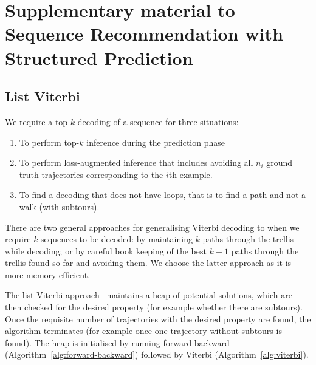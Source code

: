 \appendix
\section{Supplementary material to Sequence Recommendation with Structured Prediction}
\label{sec:supplement}

\subsection{List Viterbi}
\label{sec:listviterbi-supp}

We require a top-$k$ decoding of a sequence for three situations:
\begin{enumerate}
  \item To perform top-$k$ inference during the prediction phase
  \item To perform loss-augmented inference that includes avoiding all $n_i$ ground truth
    trajectories corresponding to the $i$th example.
  \item To find a decoding that does not have loops, that is to find a path
    and not a walk (with subtours).
\end{enumerate}

There are two general approaches for generalising Viterbi decoding to when we require $k$
sequences to be decoded: by maintaining $k$ paths through the trellis while decoding; or by
careful book keeping of the best $k-1$ paths through the trellis found so far and avoiding them.
We choose the latter approach as it is more memory efficient.

The list Viterbi approach~\cite{nilsson2001sequentially,seshadri1994list} maintains
a heap of potential solutions, which are then checked for the desired property (for example
whether there are subtours). Once the requisite number of trajectories with the desired
property are found, the algorithm terminates (for example once one trajectory without subtours
is found). The heap is initialised by running forward-backward
(Algorithm~\ref{alg:forward-backward})
followed by Viterbi (Algorithm~\ref{alg:viterbi}).

